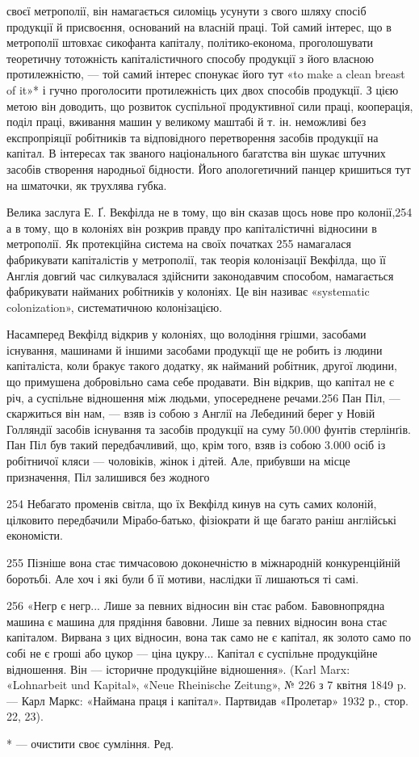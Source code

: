 своєї метрополії, він намагається силоміць усунути з свого шляху спосіб продукції й присвоєння,
оснований на власній праці. Той самий інтерес, що в метрополії штовхає сикофанта капіталу,
політико-економа, проголошувати теоретичну тотожність капіталістичного способу продукції з його
власною протилежністю, — той самий інтерес спонукає його тут «to make a clean breast of it»* і гучно
проголосити протилежність цих двох способів продукції. З цією метою він доводить, що розвиток
суспільної продуктивної сили праці, кооперація, поділ праці, вживання машин у великому маштабі й т.
ін. неможливі без експропріяції робітників та відповідного перетворення засобів продукції на
капітал. В інтересах так званого національного багатства він шукає штучних засобів створення
народньої бідности. Його апологетичний панцер кришиться тут на шматочки, як трухлява губка.

Велика заслуга Е. Ґ. Векфілда не в тому, що він сказав щось нове про колонії,254 а в тому, що в
колоніях він розкрив правду про капіталістичні відносини в метрополії. Як протекційна система на
своїх початках 255 намагалася фабрикувати капіталістів
у метрополії, так теорія колонізації Векфілда, що її Англія довгий час силкувалася здійснити
законодавчим способом, намагається фабрикувати найманих робітників у колоніях. Це він називає
«systematic colonization», систематичною колонізацією.

Насамперед Векфілд відкрив у колоніях, що володіння грішми, засобами існування, машинами й іншими
засобами продукції ще не робить із людини капіталіста, коли бракує такого додатку, як найманий
робітник, другої людини, що примушена добровільно сама себе продавати. Він відкрив, що капітал не є
річ, а суспільне відношення між людьми, упосереднене речами.256 Пан Піл, — скаржиться він нам, —
взяв із собою з Англії на Лебединий берег у Новій Голляндії засобів існування та засобів продукції
на суму 50.000 фунтів стерлінґів. Пан Піл був такий передбачливий, що, крім того, взяв із собою
3.000 осіб із робітничої кляси — чоловіків, жінок і дітей. Але, прибувши на місце призначення, Піл
залишився без жодного

254 Небагато променів світла, що їх Векфілд кинув на суть самих колоній, цілковито передбачили
Мірабо-батько, фізіократи й ще багато раніш англійські економісти.

255 Пізніше вона стає тимчасовою доконечністю в міжнародній конкуренційній боротьбі. Але хоч і які
були б її мотиви, наслідки її лишаються ті самі.

256 «Негр є негр... Лише за певних відносин він стає рабом. Бавовнопрядна машина є машина для
прядіння бавовни. Лише за певних відносин вона стає капіталом. Вирвана з цих відносин, вона так само
не є капітал, як золото само по собі не є гроші або цукор — ціна цукру... Капітал є суспільне
продукційне відношення. Він — історичне продукційне відношення». (Karl Marx: «Lohnarbeit und
Kapital», «Neue Rheinische Zeitung», № 226 з 7 квітня 1849 p. — Карл Маркс: «Наймана праця і
капітал». Партвидав «Пролетар» 1932 р., стор. 22, 23).

* — очистити своє сумління. Ред.
